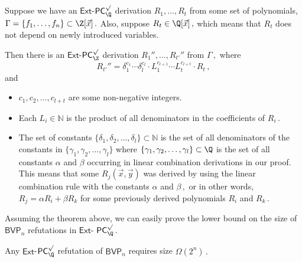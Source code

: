 \documentclass{toc}
\begin{document}
\begin{theorem}\label{transaltion-from-z-to-q}
Suppose we have an $\mathsf{Ext}$-$\mathsf{PC}^{\surd}_{\Q}$ derivation
%
%
$R_1, \ldots, R_t$  %
%
%
from some set of polynomials, %
$\Gamma = \{f_1, \ldots, f_n\} \subset \Z[\vec x]\,.$ %
%
%
Also, suppose %
$R_t \in \Q[\vec x]\,,$ %
 which means that $R_t$ does not depend on newly
introduced variables.

Then there is an $\mathsf{Ext}$-$\mathsf{PC}^{\surd}_{\Z}$ derivation
%
$R_1'', \ldots, R_{t'}''$ %
 from  %
$\Gamma\,,$ %
 where
$$
%
R_{t'}'' = \delta_1^{c_{1}} \cdots \delta_l^{c_{l}} \cdot  L_1^{c_{l + 1}} \cdots L_t^{c_{l + t}}  \cdot R_t\,, %
$$ and
\begin{itemize}
    \item $c_1, c_2, \ldots, c_{l + t}$ are some non-negative integers.  
    \item Each $L_i \in \mathbb{N}$ is the product of all denominators in the coefficients of %
$R_i\,.$ %
    \item The set of constants $\{\delta_1, \delta_2, \ldots, \delta_l\} \subset \mathbb{N}$ is the set of all denominators of the constants in $\{\gamma_1, \gamma_2, \ldots, \gamma_l\}$ where  $\{\gamma_1, \gamma_2, \ldots, \gamma_l\} \subset \Q$ is the set of all constants $\alpha$ and $\beta$ occurring in linear combination derivations in our proof. This means that some $R_j(\vec x, \vec y)$ was derived by using the linear combination rule with the constants $\alpha$ and %
$\beta\,,$ %
 or in other words, $R_j = \alpha R_i + \beta R_k$ for some previously derived polynomials $R_i$ and %
$R_k\,.$ %
\end{itemize}


\end{theorem}

%
Assuming the theorem above, we can easily prove the lower bound on the size of $\mathsf{BVP}_n$ refutations in $\mathsf{Ext}$-%
$\mathsf{PC}^{\surd}_{\Q}\,.$ %
%


\begin{theorem}\label{lower bound q}
Any $\mathsf{Ext}$-$\mathsf{PC}^{\surd}_{\Q}$ refutation of $\mathsf{BVP}_n$  requires size %
$\Omega(2^n)\,.$ %
\end{theorem} 
\end{document}
